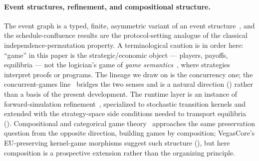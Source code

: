 \paragraph{Event structures, refinement, and compositional structure.}
The event graph is a typed, finite, asymmetric variant of an event
structure~\citep{NielsenPlotkinWinskel1981,Winskel1987EventStructures}, and the
schedule-confluence results are the protocol-setting analogue of the classical
independence-permutation property.  A terminological caution is in order here:
``game'' in this paper is the strategic/economic object --- players, payoffs,
equilibria --- not the logician's game of \emph{game
semantics}~\citep{AbramskyJagadeesan1994,HylandOng2000PCF}, where strategies
interpret proofs or programs.  The lineage we draw on is the concurrency one;
the concurrent-games
line~\citep{RideauWinskel2011Concurrent,CastellanYoshidaSessionGame} bridges the
two senses and is a natural direction () rather than a basis
of the present development.  The runtime layer is an instance of
forward-simulation refinement~\citep{LynchVaandrager1995,AbadiLamport1991},
specialized to stochastic transition kernels and extended with the
strategy-space side conditions needed to transport equilibria
().  Compositional and categorical game
theory~\citep{GhaniHedgesWinschel2018CGT,Hedges2016CGT} approaches the same
preservation question from the opposite direction, building games by
composition; VegasCore's EU-preserving kernel-game morphisms suggest such
structure (), but here composition is a prospective
extension rather than the organizing principle.

